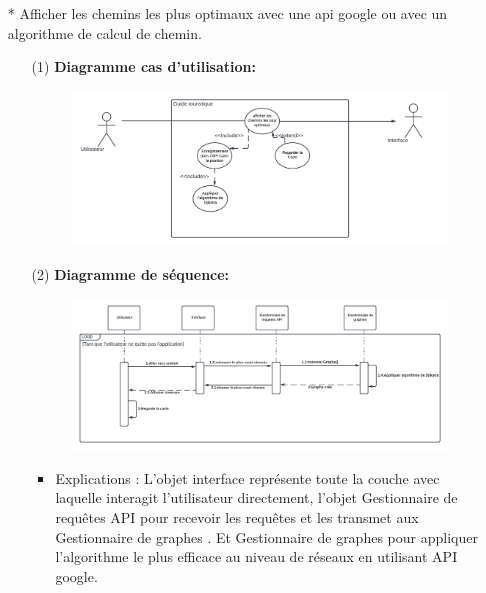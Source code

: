\documentclass[12pt]{article}
\begin{document}
\begin{itemize}
\begin{itemize}
\begin{itemize}
\end{itemize}
\end{itemize}
\item[* ]  Afficher les chemins les plus optimaux avec une api google ou avec un algorithme de calcul de chemin.
	\begin{itemize}
	\item[(1)] \textbf{Diagramme cas d'utilisation:}
\begin{figure}[!hbtp]
	\centering
	\includegraphics[scale=0.65]{Capture2_s.PNG}
\end{figure}
\item[(2)] \textbf{Diagramme de séquence:}
\begin{figure}[!hbtp]
	\centering
	\includegraphics[scale=0.65]{Capture2.PNG}
\end{figure}
\begin{itemize}
	\item  Explications : 
	L'objet interface représente toute la couche avec laquelle interagit l'utilisateur directement, l'objet Gestionnaire de requêtes API pour recevoir les requêtes et les transmet aux Gestionnaire de graphes . Et Gestionnaire de graphes pour appliquer l’algorithme le plus efficace au niveau de réseaux en utilisant API google.
	
\end{itemize}
\end{itemize}
\end{itemize}
\end{document}
